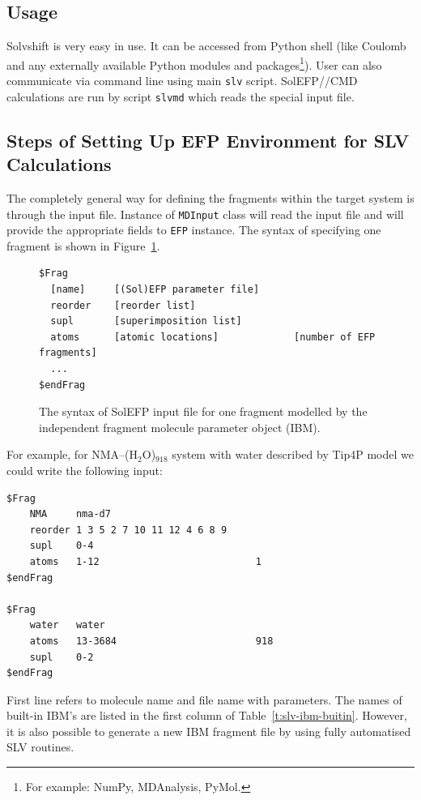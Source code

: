 \documentclass[a4paper,titlepage,twoside,fleqn,12pt]{book}
\begin{document}
\begin{refsection}
\section{Usage}

Solvshift is very easy in use. It can be accessed 
from Python shell (like {\sc Coulomb} and any externally
available Python modules and packages\footnote{For example: NumPy, MDAnalysis, PyMol.}).
User can also communicate via command line using main {\tt slv} script.
SolEFP//CMD calculations are run by script {\tt slv{\textunderscore}md} which reads the
special input file.

\subsection{Steps of Setting Up EFP Environment for SLV Calculations}

The completely general way for defining the fragments within the target system
is through the input file. 
Instance of {\tt MDInput} class
will read the input file and will provide the appropriate fields to {\tt EFP} instance. 
The syntax of specifying one fragment
is shown in Figure~\ref{f:slv-inp-file-syntax}.
%
\begin{figure}[t!]
\centering
\setlength\fboxsep{0.4pt}
\setlength\fboxrule{0.5pt}
\begin{verbatim}
$Frag
  [name]     [(Sol)EFP parameter file]
  reorder    [reorder list]
  supl       [superimposition list]
  atoms      [atomic locations]             [number of EFP fragments]
  ...
$endFrag
\end{verbatim}
\caption{
The syntax of SolEFP input file for one fragment modelled by the
independent fragment molecule parameter object (IBM).
\label{f:slv-inp-file-syntax}}
\end{figure}
%
For example, for NMA--(H$_2$O)$_{918}$ system 
with water described by Tip4P model we could 
write the following input:
%
\begin{verbatim}
$Frag
    NMA     nma-d7
    reorder 1 3 5 2 7 10 11 12 4 6 8 9
    supl    0-4
    atoms   1-12                           1
$endFrag

$Frag
    water   water
    atoms   13-3684                        918
    supl    0-2
$endFrag
\end{verbatim}
%
First line refers to molecule name and file name with parameters. 
The names of built-in IBM's are listed in the first column
of Table~\ref{t:slv-ibm-buitin}.
However, it is also possible to generate a new IBM fragment file
by using fully automatised SLV routines.


\end{refsection}
\end{document}
